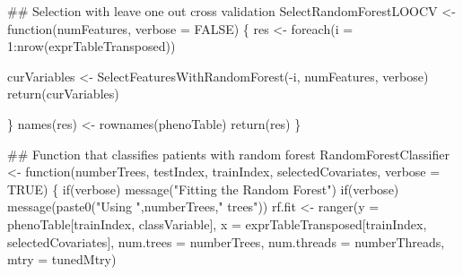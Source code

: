 \documentclass[]{article}
\newenvironment{Shaded}{\begin{snugshade}}{\end{snugshade}}
\newcommand{\CommentTok}[1]{\textcolor[rgb]{0.50,0.62,0.50}{#1}}
\newcommand{\ControlFlowTok}[1]{\textcolor[rgb]{0.94,0.87,0.69}{#1}}
\newcommand{\DataTypeTok}[1]{\textcolor[rgb]{0.87,0.87,0.75}{#1}}
\newcommand{\DecValTok}[1]{\textcolor[rgb]{0.86,0.86,0.80}{#1}}
\newcommand{\KeywordTok}[1]{\textcolor[rgb]{0.94,0.87,0.69}{#1}}
\newcommand{\NormalTok}[1]{\textcolor[rgb]{0.80,0.80,0.80}{#1}}
\newcommand{\OperatorTok}[1]{\textcolor[rgb]{0.94,0.94,0.82}{#1}}
\newcommand{\OtherTok}[1]{\textcolor[rgb]{0.94,0.94,0.56}{#1}}
\newcommand{\StringTok}[1]{\textcolor[rgb]{0.80,0.58,0.58}{#1}}
\begin{document}
\begin{Shaded}
\begin{Highlighting}[]
{\CommentTok{## Selection with leave one out cross validation}
\NormalTok{SelectRandomForestLOOCV <-}\StringTok{ }\ControlFlowTok{function}\NormalTok{(numFeatures,}
                                    \DataTypeTok{verbose =} \OtherTok{FALSE}\NormalTok{) \{}
\NormalTok{    res <-}\StringTok{ }\KeywordTok{foreach}\NormalTok{(}\DataTypeTok{i =} \DecValTok{1}\OperatorTok{:}\KeywordTok{nrow}\NormalTok{(exprTableTransposed)) }\OperatorTok{%dopar%}\StringTok{ }\NormalTok{\{}
\NormalTok{            curVariables <-}\StringTok{ }\KeywordTok{SelectFeaturesWithRandomForest}\NormalTok{(}\OperatorTok{-}\NormalTok{i,}
\NormalTok{                                                           numFeatures,}
\NormalTok{                                                           verbose)}
            \KeywordTok{return}\NormalTok{(curVariables)}

\NormalTok{    \}}
    \KeywordTok{names}\NormalTok{(res) <-}\StringTok{ }\KeywordTok{rownames}\NormalTok{(phenoTable)}
    \KeywordTok{return}\NormalTok{(res)}
\NormalTok{\}}



\CommentTok{## Function that classifies patients with random forest}
\NormalTok{RandomForestClassifier <-}\StringTok{ }\ControlFlowTok{function}\NormalTok{(numberTrees,}
\NormalTok{                                   testIndex,}
\NormalTok{                                   trainIndex,}
\NormalTok{                                   selectedCovariates,}
                                   \DataTypeTok{verbose =} \OtherTok{TRUE}\NormalTok{) \{}
    \ControlFlowTok{if}\NormalTok{(verbose) }\KeywordTok{message}\NormalTok{(}\StringTok{"Fitting the Random Forest"}\NormalTok{)}
    \ControlFlowTok{if}\NormalTok{(verbose) }\KeywordTok{message}\NormalTok{(}\KeywordTok{paste0}\NormalTok{(}\StringTok{"Using "}\NormalTok{,numberTrees,}\StringTok{" trees"}\NormalTok{))}
\NormalTok{    rf.fit <-}\StringTok{ }\KeywordTok{ranger}\NormalTok{(}\DataTypeTok{y =}\NormalTok{ phenoTable[trainIndex, classVariable],}
                     \DataTypeTok{x =}\NormalTok{ exprTableTransposed[trainIndex, selectedCovariates],}
                     \DataTypeTok{num.trees =}\NormalTok{ numberTrees,}
                     \DataTypeTok{num.threads =}\NormalTok{ numberThreads,}
                     \DataTypeTok{mtry =}\NormalTok{ tunedMtry)}

}}
\end{Highlighting}
\end{Shaded}
\end{document}
